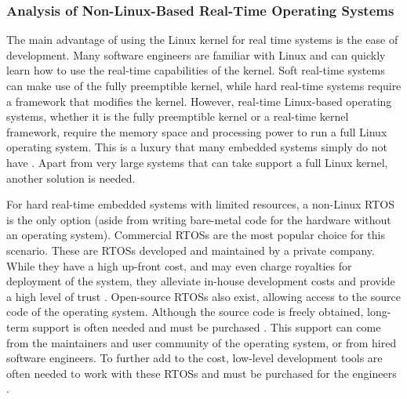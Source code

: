             \subsubsection{Analysis of Non-Linux-Based Real-Time Operating Systems}
            \markboth{}{}
                The main advantage of using the Linux kernel for real time
                    systems is the ease of development.
                Many software engineers are familiar with Linux and can quickly
                    learn how to use the real-time capabilities of the kernel.
                Soft real-time systems can make use of the fully preemptible
                    kernel, while hard real-time systems require a framework
                    that modifies the kernel.
                However, real-time Linux-based operating systems, whether it is
                    the fully preemptible kernel or a real-time kernel
                    framework, require the memory space and processing power to
                    run a full Linux operating system.
                This is a luxury that many embedded systems simply do not have
                    \cite{rtos-overview}.
                Apart from very large systems that can take support a full Linux
                    kernel, another solution is needed.

                For hard real-time embedded systems with limited resources, a
                    non-Linux RTOS is the only option (aside from writing
                    bare-metal code for the hardware without an operating
                    system).
                Commercial RTOSs are the most popular choice for this scenario.
                These are RTOSs developed and maintained by a private company.
                While they have a high up-front cost, and may even charge
                    royalties for deployment of the system, they alleviate
                    in-house development costs and provide a high level of
                    trust \cite{rtos-overview}.
                Open-source RTOSs also exist, allowing access to the source code
                    of the operating system.
                Although the source code is freely obtained, long-term support
                    is often needed and must be purchased \cite{rtos-overview}.
                This support can come from the maintainers and user community of
                    the operating system, or from hired software engineers.
                To further add to the cost, low-level development tools are
                    often needed to work with these RTOSs and must be purchased
                    for the engineers \cite{rtos-overview}.

